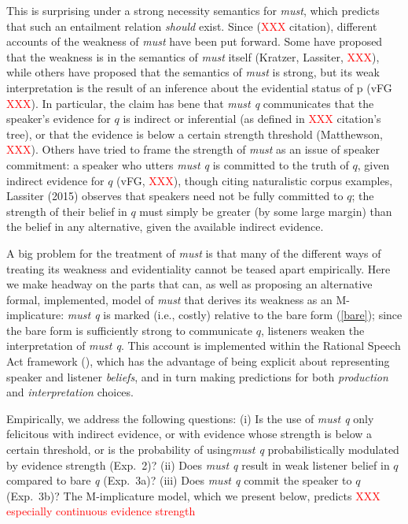 \documentclass[11pt]{article}
\newcommand{\red}[1]{\textcolor{Red}{#1}}
\begin{document}
This is surprising under a strong necessity semantics for \emph{must}, which predicts that such an entailment relation \emph{should} exist. Since (\red{XXX} citation), different accounts of the weakness of \emph{must} have been put forward. Some have proposed that the weakness is in the semantics of \emph{must} itself (Kratzer, Lassiter, \red{XXX}), while others have proposed that the semantics of \emph{must} is strong, but its weak interpretation is the result of an inference about the evidential status of p (vFG \red{XXX}). In particular, the claim has bene that \emph{must q} communicates that the speaker's evidence for $q$ is indirect or inferential (as defined in \red{XXX} citation's tree), or that the evidence is below a certain strength threshold (Matthewson, \red{XXX}). Others have tried to frame the strength of \emph{must} as an issue of speaker commitment: a speaker who utters \emph{must q} is committed to the truth of $q$, given indirect evidence for $q$ (vFG, \red{XXX}), though citing naturalistic corpus examples, Lassiter (2015) observes that speakers need not be fully committed to $q$; the strength of their belief in $q$ must simply be greater (by some large margin) than the belief in any alternative, given the available indirect evidence.

A big problem for the treatment of \emph{must} is that many of the different ways of treating its weakness and evidentiality cannot be teased apart empirically. Here we make headway on the parts that can, as well as proposing an alternative formal, implemented, model of \emph{must} that derives its weakness as an M-implicature: \emph{must q} is marked (i.e., costly) relative to the bare form (\ref{bare}); since the bare form is sufficiently strong to communicate $q$, listeners weaken the interpretation of \emph{must q}. This account is implemented within the Rational Speech Act framework (\cite{frank2012, goodmanstuhlmueller2013}), which has the advantage of being explicit about representing speaker and listener \emph{beliefs}, and in turn making predictions for both \emph{production} and  \emph{interpretation} choices.

Empirically, we address the following questions: (i) Is the use of \emph{must q} only felicitous with indirect evidence, or with evidence whose strength is below a certain threshold, or is the probability of using\emph{must q} probabilistically modulated by evidence strength (Exp.~2)? (ii) Does \emph{must q} result in weak listener belief in $q$ compared to bare \emph{q} (Exp.~3a)? (iii) Does \emph{must q} commit the speaker to $q$ (Exp.~3b)? The M-implicature model, which we present below, predicts \red{XXX especially continuous evidence strength}
\end{document}
